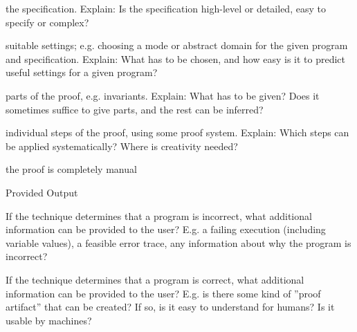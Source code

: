 \documentclass[a4paper]{article}
\begin{document}
\begin{minipage}[t]{0.16\linewidth}
\begin{betterlist}
\begin{betterlist}
			\item \checkboxHalfChecked the specification. Explain: Is the specification high-level or detailed, easy to specify or complex?

			\item \checkboxUnchecked suitable settings; e.g. choosing a mode or abstract domain for the given program and specification. Explain: What has to be chosen, and how easy is it to predict useful settings for a given program?

			\item \checkboxUnchecked parts of the proof, e.g. invariants. Explain: What has to be given? Does it sometimes suffice to give parts, and the rest can be inferred?

			\item \checkboxUnchecked individual steps of the proof, using some proof system. Explain: Which steps can be applied systematically? Where is creativity needed?

			\item \checkboxUnchecked the proof is completely manual
		\end{betterlist}
		\item \alert{Provided Output}
		\begin{betterlist}
			\item If the technique determines that a program is incorrect, what additional information can be provided to the user? E.g. a failing execution (including variable values), a feasible error trace, any information about why the program is incorrect?

			\item If the technique determines that a program is correct, what additional information can be provided to the user? E.g. is there some kind of ”proof artifact” that can be created? If so, is it easy to understand for humans? Is it usable by machines?


\end{betterlist}
\end{betterlist}
\end{minipage}
\end{document}
